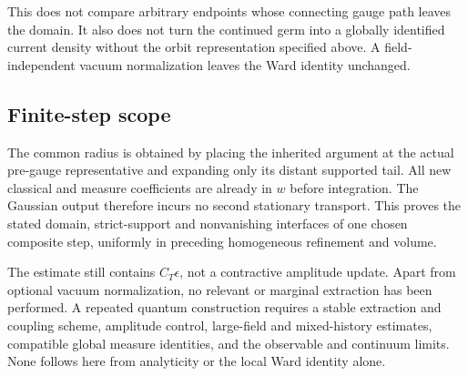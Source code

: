 This does not compare arbitrary endpoints whose
connecting gauge path leaves the domain. It also does
not turn the continued germ into a globally identified
current density without the orbit representation
specified above. A field-independent vacuum
normalization leaves the Ward identity unchanged.

\subsection{Finite-step scope}
\label{cdm-scope}

The common radius is obtained by placing the inherited
argument at the actual pre-gauge representative and
expanding only its distant supported tail. All new
classical and measure coefficients are already in
$w$ before integration. The Gaussian output therefore
incurs no second stationary transport. This proves
the stated domain, strict-support and nonvanishing
interfaces of one chosen composite step, uniformly
in preceding homogeneous refinement and volume.

The estimate still contains $C_T\epsilon$, not a
contractive amplitude update. Apart from optional
vacuum normalization, no relevant or marginal
extraction has been performed. A repeated quantum
construction requires a stable extraction and coupling
scheme, amplitude control, large-field and
mixed-history estimates, compatible global measure
identities, and the observable and continuum limits.
None follows here from analyticity or the local
Ward identity alone.
